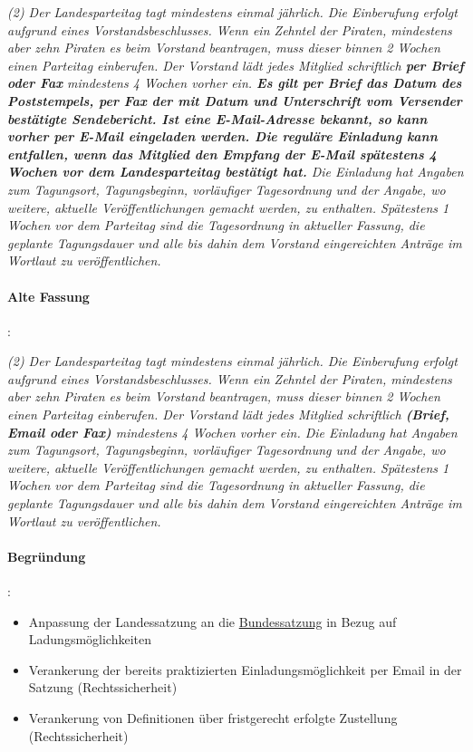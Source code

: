 \textit{(2) Der Landesparteitag tagt mindestens einmal jährlich. Die Einberufung erfolgt aufgrund eines Vorstandsbeschlusses. Wenn ein Zehntel der Piraten, mindestens aber zehn Piraten es beim Vorstand beantragen, muss dieser binnen 2 Wochen einen Parteitag einberufen. Der Vorstand lädt jedes Mitglied schriftlich \textbf{per Brief oder Fax} mindestens 4 Wochen vorher ein. \textbf{Es gilt per Brief das Datum des Poststempels, per Fax der mit Datum und Unterschrift vom Versender bestätigte Sendebericht. Ist eine E-Mail-Adresse bekannt, so kann vorher per E-Mail eingeladen werden. Die reguläre Einladung kann entfallen, wenn das Mitglied den Empfang der E-Mail spätestens 4 Wochen vor dem Landesparteitag bestätigt hat.} Die Einladung hat Angaben zum Tagungsort, Tagungsbeginn, vorläufiger Tagesordnung und der Angabe, wo weitere, aktuelle Veröffentlichungen gemacht werden, zu enthalten. Spätestens 1 Wochen vor dem Parteitag sind die Tagesordnung in aktueller Fassung, die geplante Tagungsdauer und alle bis dahin dem Vorstand eingereichten Anträge im Wortlaut zu veröffentlichen.}

\paragraph{Alte Fassung}:

\textit{(2) Der Landesparteitag tagt mindestens einmal jährlich. Die Einberufung erfolgt aufgrund eines Vorstandsbeschlusses. Wenn ein Zehntel der Piraten, mindestens aber zehn Piraten es beim Vorstand beantragen, muss dieser binnen 2 Wochen einen Parteitag einberufen. Der Vorstand lädt jedes Mitglied schriftlich \textbf{(Brief, Email oder Fax)} mindestens 4 Wochen vorher ein. Die Einladung hat Angaben zum Tagungsort, Tagungsbeginn, vorläufiger Tagesordnung und der Angabe, wo weitere, aktuelle Veröffentlichungen gemacht werden, zu enthalten. Spätestens 1 Wochen vor dem Parteitag sind die Tagesordnung in aktueller Fassung, die geplante Tagungsdauer und alle bis dahin dem Vorstand eingereichten Anträge im Wortlaut zu veröffentlichen.}

\paragraph{Begründung}:

\begin{itemize}
\item Anpassung der Landessatzung an die \href{https://wiki.piratenpartei.de/Satzung#.C2.A7_9b_-_Der_Bundesparteitag}{Bundessatzung} in Bezug auf Ladungsmöglichkeiten
\item Verankerung der bereits praktizierten Einladungsmöglichkeit per Email in der Satzung (Rechtssicherheit)
\item Verankerung von Definitionen über fristgerecht erfolgte Zustellung (Rechtssicherheit)
\end{itemize}

